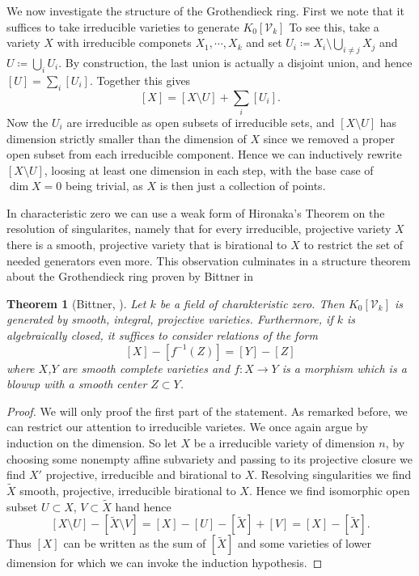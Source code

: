 \documentclass[11pt, a4paper, german]{article}
\theoremstyle{plain}
\newtheorem{theorem}{Theorem}[section]
\theoremstyle{definition}
\newcommand{\gring}[1][k]{K_0[\mathcal{V}_#1]}
\begin{document}
We now investigate the structure of the Grothendieck ring. First we note that it suffices to take irreducible varieties to generate $\gring[k]$
To see this, take a variety $X$ with irreducible componets $X_1, \cdots, X_k$ and set ${U_i \coloneqq X_i \setminus \bigcup_{i \neq j} X_j}$ and
$U \coloneqq \bigcup_i U_i$. By construction, the last union is actually a disjoint union, and hence $[U] = \sum_i [U_i]$. Together this gives
\[
    [X] = [X \setminus U] + \sum_i [U_i].
\] Now the $U_i$ are irreducible as open subsets of irreducible sets, and $[X \setminus U]$ has dimension
strictly smaller than the dimension of $X$ since we removed a proper open subset from each irreducible component. Hence we can inductively
rewrite $[X \setminus U]$, loosing at least one dimension in each step, with the base case of $\dim  X = 0$ being trivial, as $X$ is then
just a collection of points.

In characteristic zero we can use a weak form of Hironaka's Theorem on the resolution of singularites, namely that for every irreducible, 
projective variety $X$ there is a smooth, projective variety that is birational to $X$ to restrict the set of needed generators even more. 
This observation culminates in a structure theorem about the Grothendieck ring proven by Bittner in \cite{Bittner}


\begin{theorem}[Bittner, {\cite[Thm. 3.1]{Bittner}}]
    \label{bittner}
    Let $k$ be a field of charakteristic zero. Then $\gring[k]$ is generated by smooth, integral, projective varieties.
    Furthermore, if $k$ is algebraically closed, it suffices to consider relations of the form
    \[
        [X] - [f^{-1}(Z)] = [Y] - [Z]
    \]
    where $X$,$Y$ are smooth complete varieties and $f \colon X \to Y$ is a morphism which is a blowup with a smooth center $Z \subset Y$.     
\end{theorem}
\begin{proof}
    We will only proof the first part of the statement.
    As remarked before, we can restrict our attention to irreducible varietes.  We once again argue by induction on the dimension.
    So let $X$ be a irreducible variety of dimension $n$, by choosing some nonempty affine subvariety and passing to its projective closure we
    find $X'$ projective, irreducible and birational to $X$. Resolving singularities we find $\widetilde{X}$ smooth, projective, irreducible
    birational to $X$. Hence we find isomorphic open subset $U \subset X$, $V \subset \widetilde{X}$ hand hence
    \[
        [X \setminus U ] - [\widetilde{X} \setminus V] = [X] - [U] - [\widetilde{X}] + [V] = [X] - [\widetilde{X}].
    \]
    Thus $[X]$ can be written as the sum of $[\widetilde{X}]$ and some varieties of lower dimension for which we can invoke the induction
    hypothesis.
\end{proof}
\end{document}

